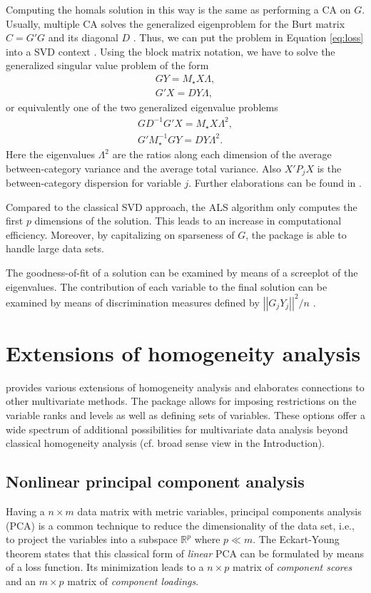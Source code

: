 \documentclass[article, nojss]{jss}
\begin{document}
Computing the homals solution in this way is the same as performing a CA on $G$. Usually, multiple CA solves the generalized eigenproblem for the Burt matrix $C=G'G$ and its diagonal \(D\) \citep{Greenacre:84,Greenacre+Blasius:06}.
Thus, we can put the problem in Equation \ref{eq:loss} into a SVD context \citep{deLeeuw+Michailides+Wang:99}. Using the block matrix notation, we have to solve the generalized singular value problem of the form
\begin{eqnarray}
GY=M_\star X\Lambda, \\
G'X=DY\Lambda,
\end{eqnarray}
or equivalently one of the two generalized eigenvalue problems
\begin{eqnarray}
GD^{-1}G'X=M_\star X\Lambda^2, \\
G'M_\star^{-1}GY=DY\Lambda^2.
\end{eqnarray}
Here the eigenvalues $\Lambda^2$ are the ratios along each dimension of the average between-category variance and the average total variance.
Also $X'P_jX$ is the between-category dispersion for variable $j$. Further elaborations can be found in \citet{Michailidis+deLeeuw:98}. 

Compared to the classical SVD approach, the ALS algorithm only computes the first $p$ dimensions of the solution. This leads to an increase in computational efficiency. Moreover, by capitalizing on sparseness of $G$, the  package is able to handle large data sets.

The goodness-of-fit of a solution can be examined by means of a screeplot of the eigenvalues. The contribution of each variable to the final solution can be examined by means of discrimination measures defined by $\left|\left|G_jY_j\right|\right|^2/n$ \citep[see][]{Meulman:1996}. 

\section{Extensions of homogeneity analysis}
\citet{Gifi:90} provides various extensions of homogeneity analysis and elaborates connections to other multivariate methods. The package  allows for imposing restrictions on the variable ranks and levels as well as defining sets of variables. These options offer a wide spectrum of additional possibilities for multivariate data analysis beyond classical homogeneity analysis (cf. broad sense view in the Introduction).

\subsection{Nonlinear principal component analysis}
Having a $n \times m$ data matrix with metric variables, principal components analysis (PCA) is a common technique to reduce the dimensionality of the data set, i.e., to project the variables into a subspace $\mathbb{R}^p$ where $p \ll m$. The Eckart-Young theorem states that this classical form of \emph{linear} PCA can be formulated by means of a loss function. Its minimization leads to a $n\times p$ matrix of \emph{component scores} and an $m \times p$ matrix of \emph{component loadings}.
\end{document}
